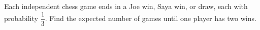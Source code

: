 Each independent chess game ends in a Joe win, Saya win, or draw, each with probability $\dfrac{1}{3}$. Find the expected number of games until one player has two wins.

